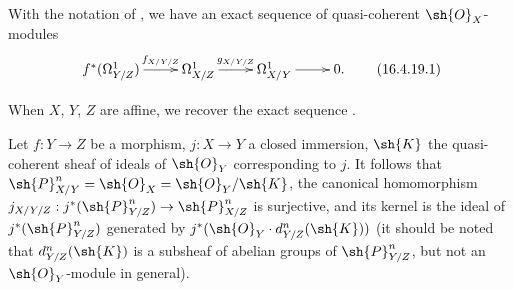 \begin{corollary}[16.4.19]
\label{IV.16.4.19}
With the notation of , we have an exact sequence of quasi-coherent $\sh{O}_X$-modules 
\[
  \label{IV.16.4.19.1}
  \xymatrix{
    f^*(\Omega_{Y/Z}^1) \ar[r]^-{f_{X/Y/Z}} & \Omega_{X/Z}^1 \ar[r]^-{g_{X/Y/Z}} & \Omega_{X/Y}^1 \ar[r] & 0.
  }
  \tag{16.4.19.1}
\]
\end{corollary}

When $X$, $Y$, $Z$ are affine, we recover the exact sequence .

\begin{proposition}[16.4.20]
\label{IV.16.4.20}
Let $f:Y \to Z$ be a morphism, $j: X \to Y$ a closed immersion, $\sh{K}$ the quasi-coherent sheaf of ideals of $\sh{O}_Y$ corresponding to $j$.
It follows that $\sh{P}_{X/Y}^n = \sh{O}_X = \sh{O}_Y/\sh{K}$, the canonical homomorphism $j_{X/Y/Z}: j^*(\sh{P}_{Y/Z}^n) \to \sh{P}_{X/Z}^n$ is surjective, and its kernel is the ideal of $j^*(\sh{P}_{Y/Z}^n)$ generated by $j^*(\sh{O}_Y \cdot d_{Y/Z}^n(\sh{K}))$ (it should be noted that $d_{Y/Z}^n(\sh{K})$ is a subsheaf of abelian groups of $\sh{P}_{Y/Z}^n$, but not an $\sh{O}_Y$-module in general).
\end{proposition}

